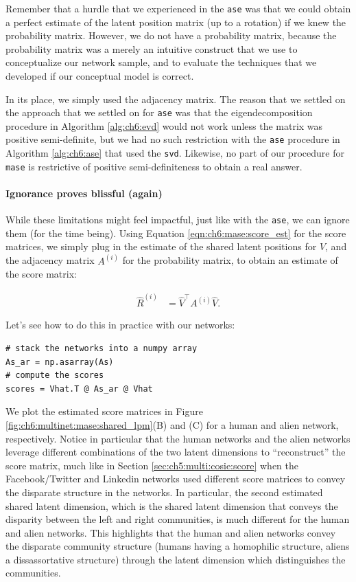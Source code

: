Remember that a hurdle that we experienced in the \texttt{ase} was that we could obtain a perfect estimate of the latent position matrix (up to a rotation) if we knew the probability matrix. However, we do not have a probability matrix, because the probability matrix was a merely an intuitive construct that we use to conceptualize our network sample, and to evaluate the techniques that we developed if our conceptual model is correct. 

In its place, we simply used the adjacency matrix. The reason that we settled on the approach that we settled on for \texttt{ase} was that the eigendecomposition procedure in Algorithm \ref{alg:ch6:evd} would not work unless the matrix was positive semi-definite, but we had no such restriction with the \texttt{ase} procedure in Algorithm \ref{alg:ch6:ase} that used the \texttt{svd}. Likewise, no part of our procedure for \texttt{mase} is restrictive of positive semi-definiteness to obtain a real answer.

\paragraph*{Ignorance proves blissful (again)}

While these limitations might feel impactful, just like with the \texttt{ase}, we can ignore them (for the time being). Using Equation \eqref{eqn:ch6:mase:score_est} for the score matrices, we simply plug in the estimate of the shared latent positions for $V$, and the adjacency matrix $A^{(i)}$ for the probability matrix, to obtain an estimate of the score matrix:

\begin{align*}
    \hat R^{(i)} &= \hat V^\top A^{(i)}\hat V.
\end{align*}

Let's see how to do this in practice with our networks:

\begin{lstlisting}[style=python]
# stack the networks into a numpy array
As_ar = np.asarray(As)
# compute the scores
scores = Vhat.T @ As_ar @ Vhat
\end{lstlisting}
We plot the estimated score matrices in Figure \ref{fig:ch6:multinet:mase:shared_lpm}(B) and (C) for a human and alien network, respectively. Notice in particular that the human networks and the alien networks leverage different combinations of the two latent dimensions to ``reconstruct'' the score matrix, much like in Section \ref{sec:ch5:multi:cosie:score} when the Facebook/Twitter and Linkedin networks used different score matrices to convey the disparate structure in the networks. In particular, the second estimated shared latent dimension, which is the shared latent dimension that conveys the disparity between the left and right communities, is much different for the human and alien networks. This highlights that the human and alien networks convey the disparate community structure (humans having a homophilic structure, aliens a dissassortative structure) through the latent dimension which distinguishes the communities.

